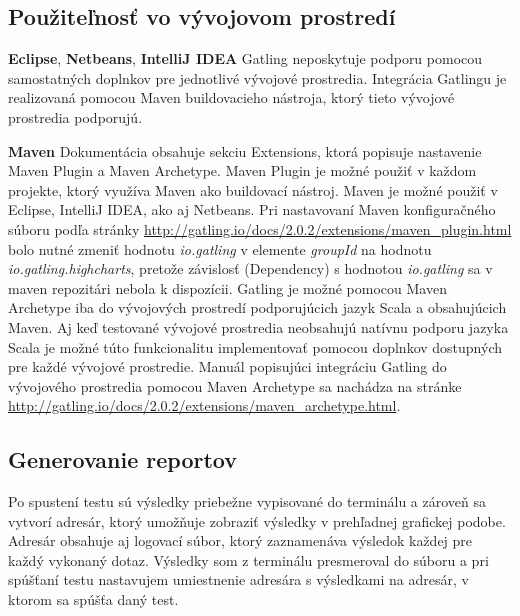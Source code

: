 \documentclass[12pt,oneside,final]{fithesis-utf8}
\begin{document}
\subsection{Použiteľnosť vo vývojovom prostredí}
\textbf{Eclipse}, \textbf{Netbeans}, \textbf{IntelliJ IDEA}
\newline
Gatling neposkytuje podporu pomocou samostatných doplnkov pre jednotlivé vývojové prostredia. Integrácia Gatlingu je realizovaná pomocou Maven buildovacieho nástroja, ktorý tieto vývojové prostredia podporujú.

\newpage
\noindent \textbf{Maven}
\newline
Dokumentácia obsahuje sekciu Extensions, ktorá popisuje nastavenie Maven Plugin a Maven Archetype.
\newline Maven Plugin je možné použiť v každom projekte, ktorý využíva Maven ako buildovací nástroj. Maven je možné použiť v Eclipse, IntelliJ IDEA, ako aj Netbeans. Pri nastavovaní Maven konfiguračného súboru podľa stránky \url{http://gatling.io/docs/2.0.2/extensions/maven_plugin.html} bolo nutné zmeniť hodnotu \textit{io.gatling} v elemente \textit{groupId} na hodnotu \textit{io.gatling.highcharts}, pretože závislosť (Dependency) s hodnotou \textit{io.gatling} sa v maven repozitári nebola k dispozícii.
\newline
\newline
Gatling je možné pomocou Maven Archetype iba do vývojových prostredí podporujúcich jazyk Scala a obsahujúcich Maven. Aj keď testované vývojové prostredia neobsahujú natívnu podporu jazyka Scala je možné túto funkcionalitu implementovať pomocou doplnkov dostupných pre každé vývojové prostredie. Manuál popisujúci integráciu Gatling do vývojového prostredia pomocou Maven Archetype sa nachádza na stránke \url{http://gatling.io/docs/2.0.2/extensions/maven_archetype.html}.
\newline

\subsection{Generovanie reportov}
Po spustení testu sú výsledky priebežne vypisované do terminálu a zároveň sa vytvorí adresár, ktorý umožňuje zobraziť výsledky v prehľadnej grafickej podobe. Adresár obsahuje aj logovací súbor, ktorý zaznamenáva výsledok každej pre každý vykonaný dotaz. Výsledky som z terminálu presmeroval do súboru a pri spúšťaní testu nastavujem umiestnenie adresára s výsledkami na adresár, v ktorom sa spúšťa daný test.
\end{document}
